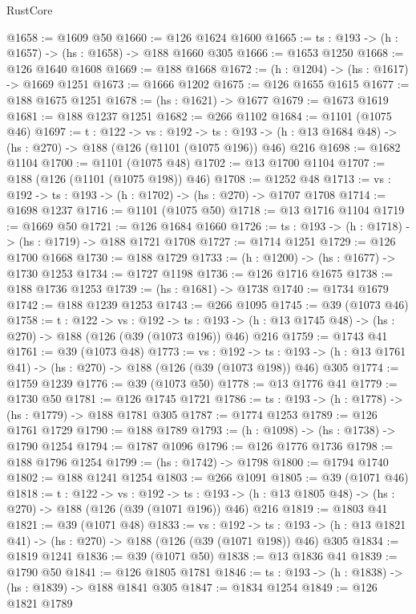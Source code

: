 \begin{lexlean}{RustCore}
\begin{coremodule}
@1658 := @1609 @50
@1660 := @126 @1624 @1600
@1665 := {ts : @193} -> (h : @1657) -> (hs : @1658) -> @188 @1660 @305
@1666 := @1653 @1250
@1668 := @126 @1640 @1608
@1669 := @188 @1668
@1672 := (h : @1204) -> (hs : @1617) -> @1669 @1251
@1673 := @1666 @1202
@1675 := @126 @1655 @1615
@1677 := @188 @1675 @1251
@1678 := (hs : @1621) -> @1677
@1679 := @1673 @1619
@1681 := @188 @1237 @1251
@1682 := @266 @1102
@1684 := @1101 (@1075 @46)
@1697 := {t : @122} ->
  {vs : @192} ->
  {ts : @193} -> (h : @13 @1684 @48) -> (hs : @270) -> @188 (@126 (@1101 (@1075 @196)) @46) @216
@1698 := @1682 @1104
@1700 := @1101 (@1075 @48)
@1702 := @13 @1700 @1104
@1707 := @188 (@126 (@1101 (@1075 @198)) @46)
@1708 := @1252 @48
@1713 := {vs : @192} -> {ts : @193} -> (h : @1702) -> (hs : @270) -> @1707 @1708
@1714 := @1698 @1237
@1716 := @1101 (@1075 @50)
@1718 := @13 @1716 @1104
@1719 := @1669 @50
@1721 := @126 @1684 @1660
@1726 := {ts : @193} -> (h : @1718) -> (hs : @1719) -> @188 @1721 @1708
@1727 := @1714 @1251
@1729 := @126 @1700 @1668
@1730 := @188 @1729
@1733 := (h : @1200) -> (hs : @1677) -> @1730 @1253
@1734 := @1727 @1198
@1736 := @126 @1716 @1675
@1738 := @188 @1736 @1253
@1739 := (hs : @1681) -> @1738
@1740 := @1734 @1679
@1742 := @188 @1239 @1253
@1743 := @266 @1095
@1745 := @39 (@1073 @46)
@1758 := {t : @122} ->
  {vs : @192} ->
  {ts : @193} -> (h : @13 @1745 @48) -> (hs : @270) -> @188 (@126 (@39 (@1073 @196)) @46) @216
@1759 := @1743 @41
@1761 := @39 (@1073 @48)
@1773 := {vs : @192} ->
  {ts : @193} -> (h : @13 @1761 @41) -> (hs : @270) -> @188 (@126 (@39 (@1073 @198)) @46) @305
@1774 := @1759 @1239
@1776 := @39 (@1073 @50)
@1778 := @13 @1776 @41
@1779 := @1730 @50
@1781 := @126 @1745 @1721
@1786 := {ts : @193} -> (h : @1778) -> (hs : @1779) -> @188 @1781 @305
@1787 := @1774 @1253
@1789 := @126 @1761 @1729
@1790 := @188 @1789
@1793 := (h : @1098) -> (hs : @1738) -> @1790 @1254
@1794 := @1787 @1096
@1796 := @126 @1776 @1736
@1798 := @188 @1796 @1254
@1799 := (hs : @1742) -> @1798
@1800 := @1794 @1740
@1802 := @188 @1241 @1254
@1803 := @266 @1091
@1805 := @39 (@1071 @46)
@1818 := {t : @122} ->
  {vs : @192} ->
  {ts : @193} -> (h : @13 @1805 @48) -> (hs : @270) -> @188 (@126 (@39 (@1071 @196)) @46) @216
@1819 := @1803 @41
@1821 := @39 (@1071 @48)
@1833 := {vs : @192} ->
  {ts : @193} -> (h : @13 @1821 @41) -> (hs : @270) -> @188 (@126 (@39 (@1071 @198)) @46) @305
@1834 := @1819 @1241
@1836 := @39 (@1071 @50)
@1838 := @13 @1836 @41
@1839 := @1790 @50
@1841 := @126 @1805 @1781
@1846 := {ts : @193} -> (h : @1838) -> (hs : @1839) -> @188 @1841 @305
@1847 := @1834 @1254
@1849 := @126 @1821 @1789

\end{coremodule}
\end{lexlean}

